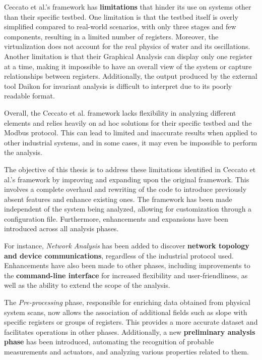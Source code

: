 \bigskip
Ceccato et al.'s framework has \textbf{limitations} that hinder its use on systems other than their specific testbed. One limitation is that the testbed itself is overly simplified compared to real-world scenarios, with only three stages and few components, resulting in a limited number of registers. Moreover, the virtualization does not account for the real physics of water and its oscillations. Another limitation is that their Graphical Analysis can display only one register at a time, making it impossible to have an overall view of the system or capture relationships between registers. Additionally, the output produced by the external tool Daikon \cite{daikon_site} for invariant analysis is difficult to interpret due to its poorly readable format.

Overall, the Ceccato et al. framework lacks flexibility in analyzing different elements and relies heavily on ad hoc solutions for their specific testbed and the Modbus protocol. This can lead to limited and inaccurate results when applied to other industrial systems, and in some cases, it may even be impossible to perform the analysis.

\bigskip
The objective of this thesis is to address these limitations identified in Ceccato et al.'s framework by improving and expanding upon the original framework. This involves a complete overhaul and rewriting of the code to introduce previously absent features and enhance existing ones. The framework has been made independent of the system being analyzed, allowing for customization through a configuration file. Furthermore, enhancements and expansions have been introduced across all analysis phases.

\bigskip
For instance, \textit{Network Analysis} has been added to discover \textbf{network topology and device communications}, regardless of the industrial protocol used. Enhancements have also been made to other phases, including improvements to the \textbf{command-line interface} for increased flexibility and user-friendliness, as well as the ability to extend the scope of the analysis.

The \textit{Pre-processing} phase, responsible for enriching data obtained from physical system scans, now allows the association of additional fields such as slope with specific registers or groups of registers. This provides a more accurate dataset and facilitates operations in other phases. Additionally, a new \textbf{preliminary analysis phase} has been introduced, automating the recognition of probable measurements and actuators, and analyzing various properties related to them.

